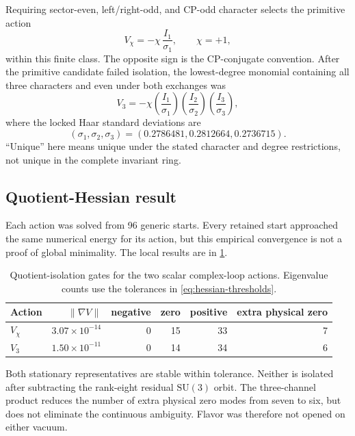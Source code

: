 \documentclass[11pt]{article}
\newcommand{\SU}{\mathrm{SU}}
\begin{document}
Requiring sector-even, left/right-odd, and CP-odd character selects the primitive action
\begin{equation}
  V_\chi=-\chi\,\frac{I_1}{\sigma_1},\qquad \chi=+1,
  \label{eq:vchi}
\end{equation}
within this finite class.  The opposite sign is the CP-conjugate convention.  After the primitive candidate failed isolation, the lowest-degree monomial containing all three characters and even under both exchanges was
\begin{equation}
  V_3=-\chi
  \left(\frac{I_1}{\sigma_1}\right)
  \left(\frac{I_2}{\sigma_2}\right)
  \left(\frac{I_3}{\sigma_3}\right),
  \label{eq:v3}
\end{equation}
where the locked Haar standard deviations are
\begin{equation}
  (\sigma_1,\sigma_2,\sigma_3)
  =(0.2786481,0.2812664,0.2736715).
\end{equation}
``Unique'' here means unique under the stated character and degree restrictions, not unique in the complete invariant ring.

\subsection{Quotient-Hessian result}

Each action was solved from 96 generic starts.  Every retained start approached the same numerical energy for its action, but this empirical convergence is not a proof of global minimality.  The local results are in \cref{tab:loop-gate}.

\begin{table}[t]
\centering
\caption{Quotient-isolation gates for the two scalar complex-loop actions.  Eigenvalue counts use the tolerances in \cref{eq:hessian-thresholds}.}
\label{tab:loop-gate}
\begin{tabular}{@{}lrrrrr@{}}
\toprule
Action & $\|\nabla V\|$ & negative & zero & positive & extra physical zero \\
\midrule
$V_\chi$ & $3.07\times10^{-14}$ & 0 & 15 & 33 & 7 \\
$V_3$    & $1.50\times10^{-11}$ & 0 & 14 & 34 & 6 \\
\bottomrule
\end{tabular}
\end{table}

Both stationary representatives are stable within tolerance.  Neither is isolated after subtracting the rank-eight residual $\SU(3)$ orbit.  The three-channel product reduces the number of extra physical zero modes from seven to six, but does not eliminate the continuous ambiguity.  Flavor was therefore not opened on either vacuum.
\end{document}
